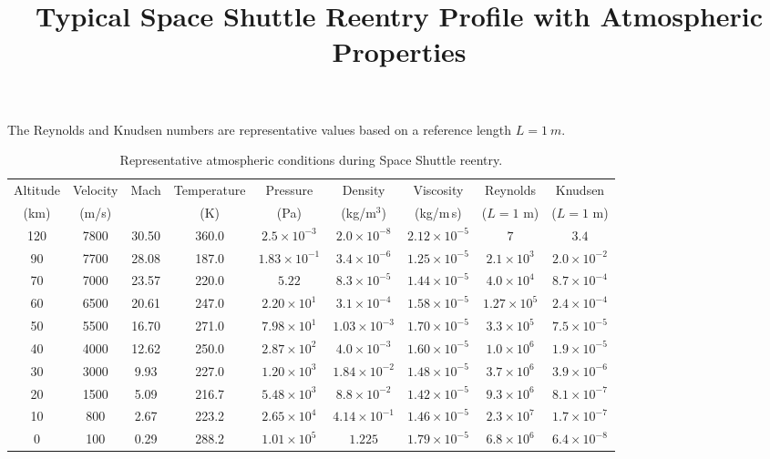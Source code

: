 \documentclass{article}
\begin{document}
\title{Typical Space Shuttle Reentry Profile with Atmospheric Properties}
\date{}
\maketitle


The Reynolds and Knudsen numbers are representative values based on a reference length
$L = \SI{1}{m}$.

\begin{table}[h!]
\centering
\small
\begin{tabular}{ccccccccc}
\toprule
Altitude & Velocity & Mach & Temperature & Pressure & Density & Viscosity & Reynolds & Knudsen \\
(km) & (m/s) &  & (K) & (Pa) & (kg/m$^3$) & (kg/m\,s) & ($L=1$ m) & ($L=1$ m) \\
\midrule
120 & 7800 & 30.50 & 360.0 & $2.5\times10^{-3}$ & $2.0\times10^{-8}$ & $2.12\times10^{-5}$ & $7$ & $3.4$ \\
90  & 7700 & 28.08 & 187.0 & $1.83\times10^{-1}$ & $3.4\times10^{-6}$ & $1.25\times10^{-5}$ & $2.1\times10^{3}$ & $2.0\times10^{-2}$ \\
70  & 7000 & 23.57 & 220.0 & $5.22$ & $8.3\times10^{-5}$ & $1.44\times10^{-5}$ & $4.0\times10^{4}$ & $8.7\times10^{-4}$ \\
60  & 6500 & 20.61 & 247.0 & $2.20\times10^{1}$ & $3.1\times10^{-4}$ & $1.58\times10^{-5}$ & $1.27\times10^{5}$ & $2.4\times10^{-4}$ \\
50  & 5500 & 16.70 & 271.0 & $7.98\times10^{1}$ & $1.03\times10^{-3}$ & $1.70\times10^{-5}$ & $3.3\times10^{5}$ & $7.5\times10^{-5}$ \\
40  & 4000 & 12.62 & 250.0 & $2.87\times10^{2}$ & $4.0\times10^{-3}$ & $1.60\times10^{-5}$ & $1.0\times10^{6}$ & $1.9\times10^{-5}$ \\
30  & 3000 & 9.93 & 227.0 & $1.20\times10^{3}$ & $1.84\times10^{-2}$ & $1.48\times10^{-5}$ & $3.7\times10^{6}$ & $3.9\times10^{-6}$ \\
20  & 1500 & 5.09 & 216.7 & $5.48\times10^{3}$ & $8.8\times10^{-2}$ & $1.42\times10^{-5}$ & $9.3\times10^{6}$ & $8.1\times10^{-7}$ \\
10  & 800 & 2.67 & 223.2 & $2.65\times10^{4}$ & $4.14\times10^{-1}$ & $1.46\times10^{-5}$ & $2.3\times10^{7}$ & $1.7\times10^{-7}$ \\
0   & 100 & 0.29 & 288.2 & $1.01\times10^{5}$ & $1.225$ & $1.79\times10^{-5}$ & $6.8\times10^{6}$ & $6.4\times10^{-8}$ \\
\bottomrule
\end{tabular}
\caption{Representative atmospheric conditions during Space Shuttle reentry.}
\end{table}
\end{document}
